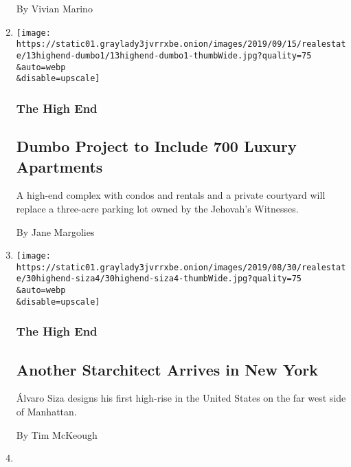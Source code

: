 \begin{enumerate}
  By Vivian Marino
\item
  \href{/2019/09/13/realestate/dumbo-brooklyn-condos-on-former-jehovahs-witness-parking-lot.html}{}

  \texttt{[image: https://static01.graylady3jvrrxbe.onion/images/2019/09/15/realestate/13highend-dumbo1/13highend-dumbo1-thumbWide.jpg?quality=75\\\&auto=webp\\\&disable=upscale]}

  \hypertarget{the-high-end-4}{%
  \subsubsection{The High End}\label{the-high-end-4}}

  \hypertarget{dumbo-project-to-include-700-luxury-apartments-1}{%
  \subsection{Dumbo Project to Include 700 Luxury
  Apartments}\label{dumbo-project-to-include-700-luxury-apartments-1}}

  A high-end complex with condos and rentals and a private courtyard
  will replace a three-acre parking lot owned by the Jehovah's
  Witnesses.

  By Jane Margolies
\item
  \href{/2019/08/30/realestate/another-starchitect-arrives-in-new-york.html}{}

  \texttt{[image: https://static01.graylady3jvrrxbe.onion/images/2019/08/30/realestate/30highend-siza4/30highend-siza4-thumbWide.jpg?quality=75\\\&auto=webp\\\&disable=upscale]}

  \hypertarget{the-high-end-5}{%
  \subsubsection{The High End}\label{the-high-end-5}}

  \hypertarget{another-starchitect-arrives-in-new-york-1}{%
  \subsection{Another Starchitect Arrives in New
  York}\label{another-starchitect-arrives-in-new-york-1}}

  Álvaro Siza designs his first high-rise in the United States on the
  far west side of Manhattan.

  By Tim McKeough
\item
  \href{/2019/08/09/realestate/now-crown-heights-gets-a-taste-of-luxury.html}{}


\end{enumerate}
